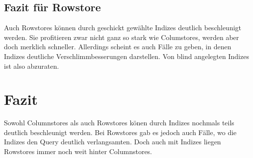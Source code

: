 \subsection{Fazit für Rowstore}
Auch Rowstores können durch geschickt gewählte Indizes deutlich beschleunigt werden. Sie profitieren zwar nicht ganz so stark wie Columstores, werden aber doch merklich schneller.  
Allerdings scheint es auch Fälle zu geben, in denen Indizes deutliche Verschlimmbesserungen darstellen. Von blind angelegten Indizes ist also abzuraten.

\section{Fazit}
Sowohl Columnstores als auch Rowstores könen durch Indizes nochmals teils deutlich 
beschleunigt werden. Bei Rowstores gab es jedoch auch Fälle, wo die Indizes den Query deutlich verlangsamten.
Doch auch mit Indizes liegen Rowstores immer noch weit hinter Columnstores. 